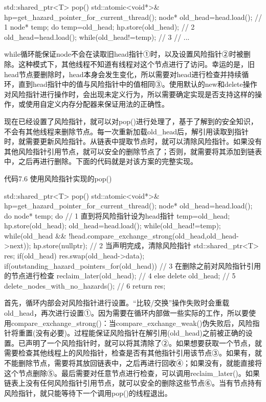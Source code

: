 \begin{cpp}
std::shared_ptr<T> pop()
{
  std::atomic<void*>& hp=get_hazard_pointer_for_current_thread();
  node* old_head=head.load();  // 1
  node* temp;
  do
  {
    temp=old_head;
    hp.store(old_head);  // 2
    old_head=head.load();
  } while(old_head!=temp); // 3
  // ...
}
\end{cpp}

while循环能保证node不会在读取旧head指针①时，以及设置风险指针②时被删除。这种模式下，其他线程不知道有线程对这个节点进行了访问。幸运的是，旧head节点要删除时，head本身会发生变化，所以需要对head进行检查并持续循环，直到head指针中的值与风险指针中的值相同③。使用默认的new和delete操作对风险指针进行操作时，会出现未定义行为，所以需要确定实现是否支持这样的操作，或使用自定义内存分配器来保证用法的正确性。

现在已经设置了风险指针，就可以对pop()进行处理了，基于了解到的安全知识，不会有其他线程来删除节点。每一次重新加载old\_head后，解引用读取到指针时，就需要更新风险指针。从链表中提取节点时，就可以清除风险指针。如果没有其他风险指针引用节点，就可以安全的删除节点了；否则，就需要将其添加到链表中，之后再进行删除。下面的代码就是对该方案的完整实现。

代码7.6 使用风险指针实现的pop()

\begin{cpp}
std::shared_ptr<T> pop()
{
  std::atomic<void*>& hp=get_hazard_pointer_for_current_thread();
  node* old_head=head.load();
  do
  {
    node* temp;
    do  // 1 直到将风险指针设为head指针
    {
      temp=old_head;
      hp.store(old_head);
      old_head=head.load();
    } while(old_head!=temp);
  }
  while(old_head &&
    !head.compare_exchange_strong(old_head,old_head->next));
  hp.store(nullptr);  // 2 当声明完成，清除风险指针
  std::shared_ptr<T> res;
  if(old_head)
  {
    res.swap(old_head->data);
    if(outstanding_hazard_pointers_for(old_head))  // 3 在删除之前对风险指针引用的节点进行检查
    {
      reclaim_later(old_head);  // 4
    }
    else
    {
      delete old_head;  // 5
    }
    delete_nodes_with_no_hazards();  // 6
  }
  return res;
}
\end{cpp}

首先，循环内部会对风险指针进行设置。“比较/交换”操作失败时会重载old\_head，再次进行设置①。因为需要在循环内部做一些实际的工作，所以要使用compare\_exchange\_strong()：当compare\_exchange\_weak()伪失败后，风险指针将重置(没有必要)。过程能保证风险指针在解引用(old\_head)之前被正确的设置。已声明了一个风险指针时，就可以将其清除了②。如果想要获取一个节点，就需要检查其他线程上的风险指针，检查是否有其他指针引用该节点③。如果有，就不能删除节点，需要将其放回链表中，之后再进行回收④；如果没有，就能直接将这个节点删除⑤。最后需要对任意节点进行检查，可以调用reclaim\_later()。如果链表上没有任何风险指针引用节点，就可以安全的删除这些节点⑥。当有节点持有风险指针，就只能等待下一个调用pop()的线程退出。

